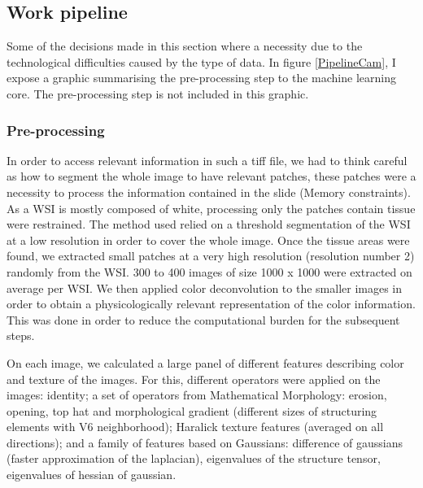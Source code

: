\documentclass{article}
\begin{document}
\subsection{Work pipeline}
Some of the decisions made in this section where a necessity due to the technological difficulties caused by the type of data. In figure \ref{PipelineCam}, I expose a graphic summarising the pre-processing step to the machine learning core. The pre-processing step is not included in this graphic.



\subsubsection*{Pre-processing}

In order to access relevant information in such a tiff file, we had to think careful as how to segment the whole image to have relevant patches, these patches were a necessity to process the information contained in the slide (Memory constraints). As a WSI is mostly composed of white, processing only the patches contain tissue were restrained. The method used relied on a threshold segmentation of the WSI at a low resolution in order to cover the whole image. Once the tissue areas were found, we extracted small patches at a very high resolution (resolution number 2) randomly from the WSI. 300 to 400 images of size 1000 x 1000 were extracted on average per WSI. We then applied color deconvolution \cite{deconvolution} to the smaller images in order to obtain a physicologically relevant representation
of the color information.  This was done in order to reduce the
computational burden for the subsequent steps.

On each image, we calculated a large panel of different features describing color
and texture of the images. For this, different operators were applied
on the images: identity; a set of operators from Mathematical
Morphology: erosion, opening, top hat and morphological gradient (different
sizes of structuring elements with V6 neighborhood); Haralick texture
features (averaged on all directions); and a family of features based
on Gaussians: difference of gaussians (faster approximation of the
laplacian), eigenvalues of the structure tensor, eigenvalues of
hessian of gaussian. 
\end{document}
